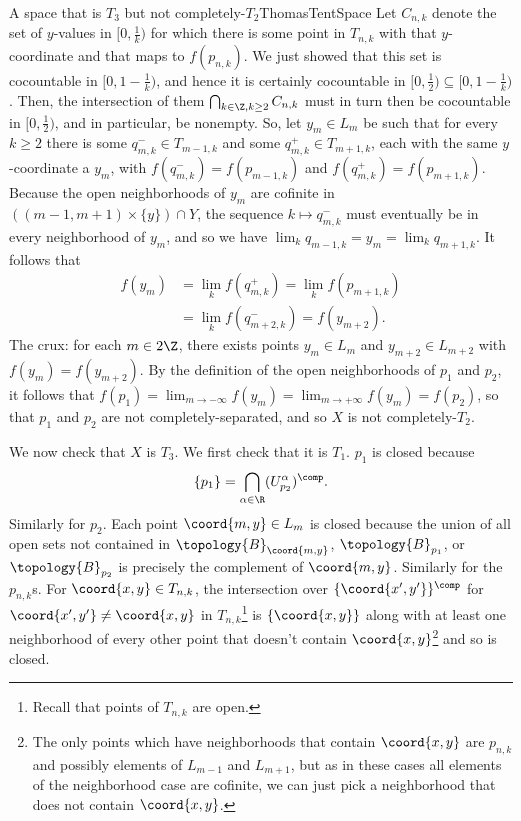 \begin{exm}{A space that is $T_3$ but not completely-$T_2$}{ThomasTentSpace}
Let $C_{n,k}$ denote the set of $y$-values in $[0,\tfrac{1}{k})$ for which there is some point in $T_{n,k}$ with that $y$-coordinate and that maps to $f(p_{n,k})$.  We just showed that this set is cocountable in $[0,1-\frac{1}{k})$, and hence it is certainly cocountable in $[0,\frac{1}{2})\subseteq [0,1-\frac{1}{k})$.  Then, the intersection of them $\bigcap _{k\in \Z ,k\geq 2}C_{n,k}$ must in turn then be cocountable in $[0,\frac{1}{2})$, and in particular, be nonempty.  So, let $y_m\in L_m$ be such that for every $k\geq 2$ there is some $q_{m,k}^-\in T_{m-1,k}$ and some $q_{m,k}^+\in T_{m+1,k}$, each with the same $y$-coordinate a $y_m$, with $f(q_{m,k}^-)=f(p_{m-1,k})$ and $f(q_{m,k}^+)=f(p_{m+1,k})$.  Because the open neighborhoods of $y_m$ are cofinite in $((m-1,m+1)\times \{ y\} )\cap Y$, the sequence $k\mapsto q_{m,k}^-$ must eventually be in every neighborhood of $y_m$, and so we have $\lim _kq_{m-1,k}=y_m=\lim _kq_{m+1,k}$.  It follows that
\begin{equation}
\begin{split}
f(y_m) & =\lim _kf(q_{m,k}^+)=\lim _kf(p_{m+1,k}) \\
& =\lim _kf(q_{m+2,k}^-)=f(y_{m+2}).
\end{split}
\end{equation}
The crux:  for each $m\in 2\Z$, there exists points $y_m\in L_m$ and $y_{m+2}\in L_{m+2}$ with $f(y_m)=f(y_{m+2})$.  By the definition of the open neighborhoods of $p_1$ and $p_2$, it follows that $f(p_1)=\lim _{m\to -\infty}f(y_m)=\lim _{m\to +\infty}f(y_m)=f(p_2)$, so that $p_1$ and $p_2$ are not completely-separated, and so $X$ is not completely-$T_2$.

We now check that $X$ is $T_3$.  We first check that it is $T_1$.  $p_1$ is closed because
\begin{equation}
\{ p_1\} =\bigcap _{\alpha \in \R}(U_{p_2}^\alpha )^{\comp}.
\end{equation}
Similarly for $p_2$.  Each point $\coord{m,y}\in L_m$ is closed because the union of all open sets not contained in $\topology{B}_{\coord{m,y}}$, $\topology{B}_{p_1}$, or $\topology{B}_{p_2}$ is precisely the complement of $\coord{m,y}$.  Similarly for the $p_{n,k}$s.  For $\coord{x,y}\in T_{n,k}$, the intersection over $\{ \coord{x',y'}\} ^{\comp}$ for $\coord{x',y'}\neq \coord{x,y}$ in $T_{n,k}$\footnote{Recall that points of $T_{n,k}$ are open.} is $\{ \coord{x,y}\}$ along with at least one neighborhood of every other point that doesn't contain $\coord{x,y}$\footnote{The only points which have neighborhoods that contain $\coord{x,y}$ are $p_{n,k}$ and possibly elements of $L_{m-1}$ and $L_{m+1}$, but as in these cases all elements of the neighborhood case are cofinite, we can just pick a neighborhood that does not contain $\coord{x,y}$.} and so is closed.


\end{exm}

